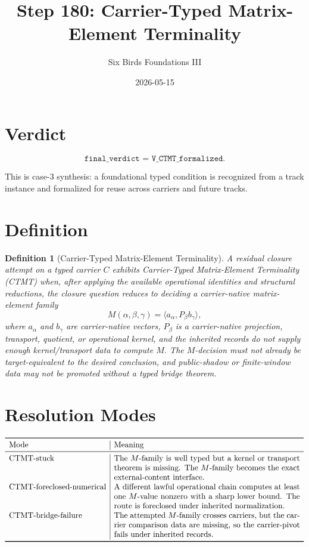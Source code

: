 \documentclass[11pt]{article}
\title{Step 180: Carrier-Typed Matrix-Element Terminality}
\author{Six Birds Foundations III}
\date{2026-05-15}
\newtheorem{definition}{Definition}
\begin{document}
\maketitle

\section{Verdict}

\[
\boxed{\texttt{final\_verdict = V\_CTMT\_formalized}.}
\]

This is case-3 synthesis: a foundational typed condition is recognized from a
track instance and formalized for reuse across carriers and future tracks.

\section{Definition}

\begin{definition}[Carrier-Typed Matrix-Element Terminality]
A residual closure attempt on a typed carrier \(C\) exhibits
\emph{Carrier-Typed Matrix-Element Terminality} (CTMT) when, after applying the
available operational identities and structural reductions, the closure
question reduces to deciding a carrier-native matrix-element family
\[
M(\alpha,\beta,\gamma)
=
\langle a_\alpha,P_\beta b_\gamma\rangle,
\]
where \(a_\alpha\) and \(b_\gamma\) are carrier-native vectors, \(P_\beta\) is
a carrier-native projection, transport, quotient, or operational kernel, and
the inherited records do not supply enough kernel/transport data to compute
\(M\).  The \(M\)-decision must not already be target-equivalent to the desired
conclusion, and public-shadow or finite-window data may not be promoted without
a typed bridge theorem.
\end{definition}

\section{Resolution Modes}

\[
\begin{array}{l|p{0.68\linewidth}}
\toprule
\text{Mode} & \text{Meaning}\\
\midrule
\text{CTMT-stuck} &
The \(M\)-family is well typed but a kernel or transport theorem is missing.
The \(M\)-family becomes the exact external-content interface.\\
\text{CTMT-foreclosed-numerical} &
A different lawful operational chain computes at least one \(M\)-value
nonzero with a sharp lower bound.  The route is foreclosed under inherited
normalization.\\
\text{CTMT-bridge-failure} &
The attempted \(M\)-family crosses carriers, but the carrier comparison data
are missing, so the carrier-pivot fails under inherited records.\\
\bottomrule
\end{array}
\]
\end{document}
